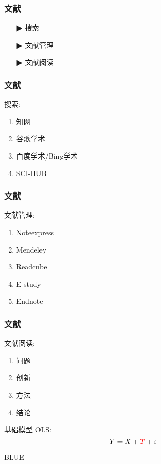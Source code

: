 \documentclass[11pt,mathserif]{beamer} %
\begin{document}
\begin{frame}
  \frametitle{文献}
  \begin{itemize}
    \item[$\RHD$] 搜索
    \item[$\RHD$] 文献管理
    \item[$\RHD$] 文献阅读
  \end{itemize}
\end{frame}

\begin{frame}
  \frametitle{文献}
  \begin{block}{搜索:}
    \begin{enumerate}
    	\item 知网
    	\item 谷歌学术
    	\item 百度学术/Bing学术
    	\item SCI-HUB
    \end{enumerate}
  \end{block}
\end{frame}

\begin{frame}
  \frametitle{文献}
  \begin{block}{文献管理:}
    \begin{enumerate}
    	\item Noteexpress
    	\item Mendeley
    	\item Readcube
    	\item E-study
    	\item Endnote
    \end{enumerate}
  \end{block}
\end{frame}

\begin{frame}
  \frametitle{文献}
  \begin{block}{文献阅读:}
    \begin{enumerate}
    	\item 问题
    	\item 创新
    	\item 方法
    	\item 结论
    \end{enumerate}
  \end{block}
\end{frame}

\begin{frame}{基础模型}
OLS:
\[
  Y=X+{\color{red}T }+\varepsilon
\]
\begin{theorem}
  BLUE
\end{theorem}
\end{frame}
\end{document}
